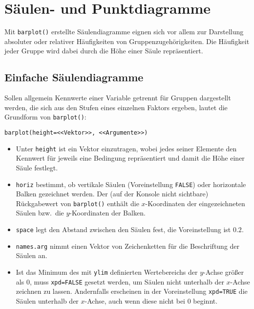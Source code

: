 \section{Säulen- und Punktdiagramme}
\label{sec:barplot}

Mit \lstinline!barplot()! erstellte Säulendiagramme eignen sich vor allem zur Darstellung absoluter oder relativer Häufigkeiten von Gruppenzugehörigkeiten. Die Häufigkeit jeder Gruppe wird dabei durch die Höhe einer Säule repräsentiert.

\subsection{Einfache Säulendiagramme}

Sollen allgemein Kennwerte einer Variable getrennt für Gruppen dargestellt werden, die sich aus den Stufen eines einzelnen Faktors ergeben, lautet die Grundform von \lstinline!barplot()!:
\begin{lstlisting}
barplot(height=<<Vektor>>, <<Argumente>>)
\end{lstlisting}

\begin{itemize}
\item Unter \lstinline!height! ist ein Vektor einzutragen, wobei jedes seiner Elemente den Kennwert für jeweils eine Bedingung repräsentiert und damit die Höhe einer Säule festlegt.
\item \lstinline!horiz! bestimmt, ob vertikale Säulen (Voreinstellung \lstinline!FALSE!) oder horizontale Balken gezeichnet werden. Der (auf der Konsole nicht sichtbare) Rückgabewert von \lstinline!barplot()! enthält die $x$-Koordinaten der eingezeichneten Säulen bzw.\ die $y$-Koordinaten der Balken.
\item \lstinline!space! legt den Abstand zwischen den Säulen fest, die Voreinstellung ist $0.2$.
\item \lstinline!names.arg! nimmt einen Vektor von Zeichenketten für die Beschriftung der Säulen an.
\item Ist das Minimum des mit \lstinline!ylim! definierten Wertebereichs der $y$-Achse größer als $0$, muss \lstinline!xpd=FALSE! gesetzt werden, um Säulen nicht unterhalb der $x$-Achse zeichnen zu lassen. Andernfalls erscheinen in der Voreinstellung \lstinline!xpd=TRUE! die Säulen unterhalb der $x$-Achse, auch wenn diese nicht bei $0$ beginnt.
\end{itemize}

